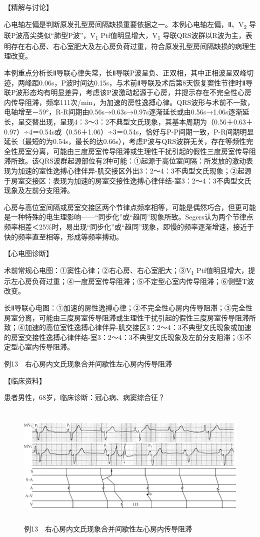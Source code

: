 【精解与讨论】

心电轴左偏是判断原发孔型房间隔缺损重要依据之一。本例心电轴左偏，Ⅱ、V\textsubscript{2}
导联P波高尖类似“肺型P波”，V\textsubscript{1}
Ptf值明显增大，V\textsubscript{1}
导联QRS波群以R波为主，表明存在右心房、右心室肥大及左心房负荷过重，符合原发孔型房间隔缺损的病理生理改变。

本例重点分析长Ⅱ导联心律失常，长Ⅱ导联P波呈负、正双相，其中正相波呈双峰切迹，两峰距0.06s，P波时间达0.15s，与术前Ⅱ导联及术后第8天恢复窦性节律时Ⅱ导联P波形态均有明显差异，考虑该P波激动起源于心房，并提示存在不完全性心房内传导阻滞，频率111次/min，为加速的房性逸搏心律。QRS波形与术前不一致，电轴增至－59°，R-R间期由0.56s→0.63s→0.97s逐渐延长或由0.56s→1.06s逐渐延长，呈交替出现，呈现4：3～3：2不典型文氏现象，其基本周期为（0.56＋0.63＋0.97）÷4＝0.54s或（0.56＋1.06）÷3＝0.54s，恰好与P-P间期一致，P-R间期明显延长（最短的为0.54s，最长的达0.66s），考虑P波与QRS波群无关，存在等频性完全性房室分离，可能由三度房室传导阻滞或生理性干扰引起的假性三度房室传导阻滞所致。该QRS波群起源部位有2种可能：①起源于高位室间隔：所发放的激动表现为加速的室性逸搏心律伴异-肌交接区外出3：2～4：3不典型文氏现象；②起源于房室交接区：表现为加速的房室交接性逸搏心律伴结-室3：2～4：3不典型文氏现象及左前分支阻滞。

心房与高位室间隔或房室交接区两个节律点频率相等，可能是偶然巧合，但更可能是一种特殊的电生理影响------“同步化”或“趋同”现象所致。Segers认为两个节律点频率相差＜25\%时，易出现“同步化”或“趋同”现象，即慢的频率逐渐增速，接近于快的频率直至相等，形成等频率搏动。

【心电图诊断】

术前常规心电图：①窦性心律；②右心房、右心室肥大；③V\textsubscript{1}
Ptf值明显增大，提示左心房负荷过重；④一度房室传导阻滞；⑤不定型心室内传导阻滞；⑥侧壁T波改变。

长Ⅱ导联心电图：①加速的房性逸搏心律；②不完全性心房内传导阻滞；③完全性房室分离，可能由三度房室传导阻滞或生理性干扰引起的假性三度房室传导阻滞所致；④加速的高位室性逸搏心律伴异-肌交接区3：2～4：3不典型文氏现象或加速的房室交接性逸搏心律伴结-室3：2～4：3不典型文氏现象及左前分支阻滞；⑤不定型心室内传导阻滞。

例13　右心房内文氏现象合并间歇性左心房内传导阻滞

【临床资料】

患者男性，68岁，临床诊断：冠心病、病窦综合征？

\begin{figure}[!htbp]
 \centering
 \includegraphics[width=5.875in,height=2.34375in]{./images/Image00771.jpg}
 \captionsetup{justification=centering}
 \caption{例13　右心房内文氏现象合并间歇性左心房内传导阻滞}
 \label{fig50-13}
  \end{figure} 

